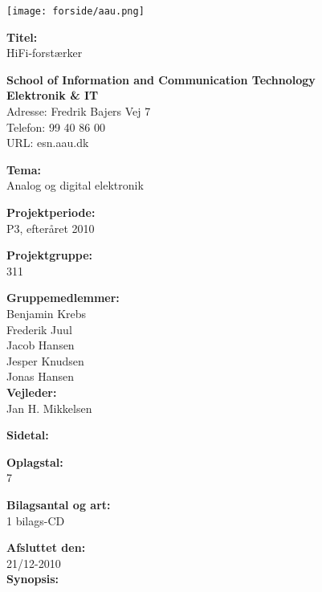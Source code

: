 \begin{multicols}{2}
\texttt{[image: forside/aau.png]}

\small{\textbf{Titel:\\}
HiFi-forstærker}

\scriptsize{\textbf{School of Information and Communication Technology\\ Elektronik \& IT\\}
Adresse: Fredrik Bajers Vej 7\\
Telefon: 99 40 86 00\\
URL: esn.aau.dk \\}
\end{multicols}
\begin{multicols}{2}

\small{
\textbf{Tema:\\}
Analog og digital elektronik

\textbf{Projektperiode:\\}
P3, efteråret 2010

\textbf{Projektgruppe:\\}
311

\textbf{Gruppemedlemmer:\\}
Benjamin Krebs\\
Frederik Juul\\
Jacob Hansen\\
Jesper Knudsen\\
Jonas Hansen\\

\textbf{Vejleder:\\}
Jan H. Mikkelsen

\textbf{Sidetal:\\}
\pageref{LastPage}

\textbf{Oplagstal:\\}
7

\textbf{Bilagsantal og art:\\}
1 bilags-CD

\textbf{Afsluttet den:\\}
21/12-2010
\\
\textbf{Synopsis:}
}

\end{multicols}
